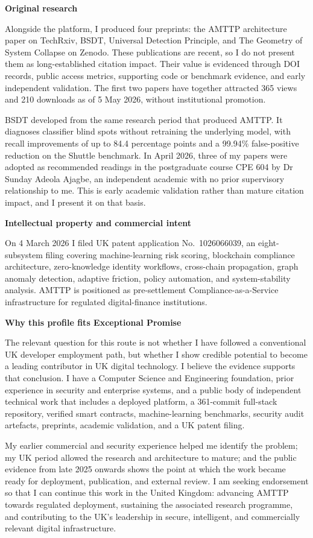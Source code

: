 \documentclass[12pt,a4paper]{article}
\begin{document}
\textbf{Original research}

Alongside the platform, I produced four preprints: the AMTTP architecture paper on TechRxiv, BSDT, Universal Detection Principle, and The Geometry of System Collapse on Zenodo. These publications are recent, so I do not present them as long-established citation impact. Their value is evidenced through DOI records, public access metrics, supporting code or benchmark evidence, and early independent validation. The first two papers have together attracted 365 views and 210 downloads as of 5 May 2026, without institutional promotion.

BSDT developed from the same research period that produced AMTTP. It diagnoses classifier blind spots without retraining the underlying model, with recall improvements of up to 84.4 percentage points and a 99.94\% false-positive reduction on the Shuttle benchmark. In April 2026, three of my papers were adopted as recommended readings in the postgraduate course CPE 604 by Dr Sunday Adeola Ajagbe, an independent academic with no prior supervisory relationship to me. This is early academic validation rather than mature citation impact, and I present it on that basis.

\textbf{Intellectual property and commercial intent}

On 4 March 2026 I filed UK patent application No.\ 1026066039, an eight-subsystem filing covering machine-learning risk scoring, blockchain compliance architecture, zero-knowledge identity workflows, cross-chain propagation, graph anomaly detection, adaptive friction, policy automation, and system-stability analysis. AMTTP is positioned as pre-settlement Compliance-as-a-Service infrastructure for regulated digital-finance institutions.

\textbf{Why this profile fits Exceptional Promise}

The relevant question for this route is not whether I have followed a conventional UK developer employment path, but whether I show credible potential to become a leading contributor in UK digital technology. I believe the evidence supports that conclusion. I have a Computer Science and Engineering foundation, prior experience in security and enterprise systems, and a public body of independent technical work that includes a deployed platform, a 361-commit full-stack repository, verified smart contracts, machine-learning benchmarks, security audit artefacts, preprints, academic validation, and a UK patent filing.

My earlier commercial and security experience helped me identify the problem; my UK period allowed the research and architecture to mature; and the public evidence from late 2025 onwards shows the point at which the work became ready for deployment, publication, and external review. I am seeking endorsement so that I can continue this work in the United Kingdom: advancing AMTTP towards regulated deployment, sustaining the associated research programme, and contributing to the UK's leadership in secure, intelligent, and commercially relevant digital infrastructure.
\end{document}
